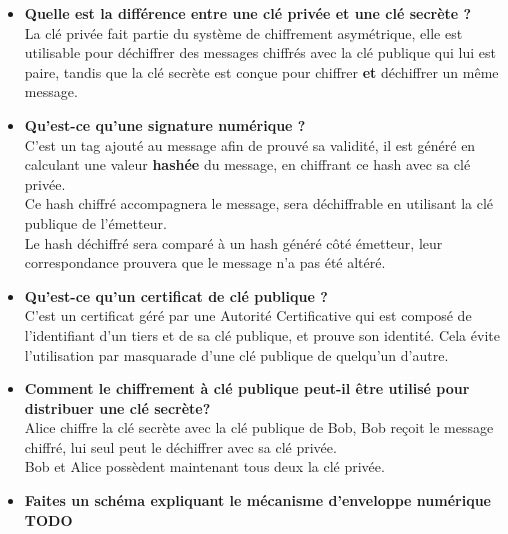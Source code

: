 \documentclass{report}
\begin{document}
\begin{itemize}
				\item \textbf{Quelle est la différence entre une clé privée et une clé secrète ?}\\

					La clé privée fait partie du système de chiffrement asymétrique, elle est utilisable pour déchiffrer des messages chiffrés avec la clé publique qui lui est paire, tandis que la clé secrète est conçue pour chiffrer \textbf{et} déchiffrer un même message.\\

				\item \textbf{Qu'est-ce qu'une signature numérique ?}\\

					C'est un tag ajouté au message afin de prouvé sa validité, il est généré en calculant une valeur \textbf{hashée} du message, en chiffrant ce hash avec sa clé privée.\\
					Ce hash chiffré accompagnera le message, sera déchiffrable en utilisant la clé publique de l'émetteur.\\
					Le hash déchiffré sera comparé à un hash généré côté émetteur, leur correspondance prouvera que le message n'a pas été altéré.\\

				\item \textbf{Qu'est-ce qu'un certificat de clé publique ?}\\

					C'est un certificat géré par une Autorité Certificative qui est composé de l'identifiant d'un tiers et de sa clé publique, et prouve son identité. Cela évite l'utilisation par masquarade d'une clé publique de quelqu'un d'autre.\\

				\item \textbf{Comment le chiffrement à clé publique peut-il être utilisé pour distribuer une clé secrète?}\\

					Alice chiffre la clé secrète avec la clé publique de Bob, Bob reçoit le message chiffré, lui seul peut le déchiffrer avec sa clé privée.\\
					Bob et Alice possèdent maintenant tous deux la clé privée.\\

				\item \textbf{Faites un schéma expliquant le mécanisme d'enveloppe numérique}\\

					\textbf{TODO}

			\end{itemize}
\end{document}
